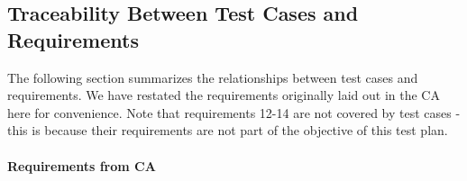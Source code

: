 \documentclass[12pt, titlepage]{article}
\begin{document}
\begin{enumerate}
\end{enumerate}


\subsection{Traceability Between Test Cases and Requirements}
The following section summarizes the relationships between test cases and 
requirements. We have restated the requirements originally laid out in  the CA 
here for convenience. Note that requirements 12-14 are not covered by test 
cases - this is because their requirements are not part of the objective of 
this test plan.

\paragraph{Requirements from CA} 
~\newline
\noindent 
\end{document}
